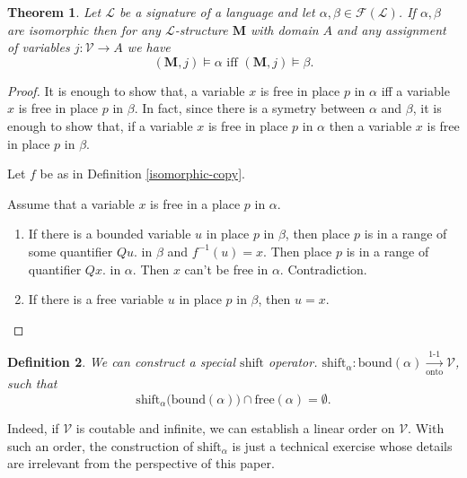 \documentclass[10pt]{article}
\theoremstyle{plain}
\newtheorem{theorem}{Theorem}[section]
\newtheorem{definition}[theorem]{Definition}
\newcommand{\free}{\text{free}}
\newcommand{\bound}{\text{bound}}
\newcommand{\F}{\mathcal{F}}
\renewcommand{\L}{\mathscr{L}}
\newcommand{\V}{\mathscr{V}}
\newcommand{\M}{\mathbf{M}}
\newcommand{\shift}{\text{shift}}
\begin{document}
\begin{theorem}
\label{isomorphic-equisatisatibility}
Let $\L$ be a signature of a language and let $\alpha,\beta\in\F(\L)$.
If $\alpha, \beta$ are isomorphic then for any $\L$-structure $\M$ with domain $A$ and any assignment of variables $j:\V\to A$ we have
$$
(\M, j)\models \alpha \text{ iff } (\M, j)\models \beta.
$$
\end{theorem}
\begin{proof}
It is enough to show that, 
a variable $x$ is free in place $p$ in $\alpha$ iff
a variable $x$ is free in place $p$ in $\beta$.
In fact, since there is a symetry between $\alpha$ and $\beta$, it is enough to show that, if 
a variable $x$ is free in place $p$ in $\alpha$ then
a variable $x$ is free in place $p$ in $\beta$.

Let $f$ be as in Definition \ref{isomorphic-copy}.

Assume that a variable $x$ is free in a place $p$ in $\alpha$.

\begin{enumerate}
\item If there is a bounded variable $u$ in place $p$ in $\beta$, then place $p$ is in a range of some quantifier $Qu.$ in $\beta$ and $f^{-1}(u) = x$. Then place $p$ is in a range of quantifier $Qx.$ in $\alpha$. Then $x$ can't be free in $\alpha$. Contradiction.

\item If there is a free variable $u$ in place $p$ in $\beta$, then $u = x$.
\end{enumerate}
\end{proof}

\begin{definition}
We can construct a special $\shift$ operator. 
$\shift_\alpha:\bound(\alpha) \xrightarrow[\text{onto}]{\text{1-1}} \V$, such that
$$
\shift_\alpha\big( \bound(\alpha)\big) \cap \free(\alpha) = \emptyset.
$$
\end{definition}

Indeed, if $\V$ is coutable and infinite, we can establish a linear order on $\V$. With such an order, the construction of $\shift_\alpha$ is just a technical exercise whose details are irrelevant from the perspective of this paper.
\end{document}
